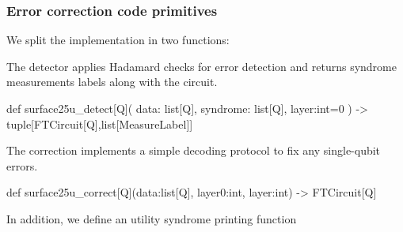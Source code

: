 \subsubsection{Error correction code primitives}

We split the implementation in two functions:

\ls The detector applies Hadamard checks for error detection and returns syndrome measurements
    labels along with the circuit.

  \begin{python}
  def surface25u_detect[Q](
    data: list[Q], syndrome: list[Q], layer:int=0
  ) -> tuple[FTCircuit[Q],list[MeasureLabel]]
  \end{python}

\li The correction implements a simple decoding protocol to fix any single-qubit errors.

  \begin{comment}
    \begin{sh}
    printf '\\begin{%
    cat $PROJECT_ROOT/python/qecsurface/qeccs.py | \
    sedlines.sh -C 'surface25u_correct' | head -n 1
    printf '\\end{%
    \end{sh}
  \end{comment}

  \begin{python}
  def surface25u_correct[Q](data:list[Q], layer0:int, layer:int) -> FTCircuit[Q]
  \end{python}

\li In addition, we define an utility syndrome printing function

